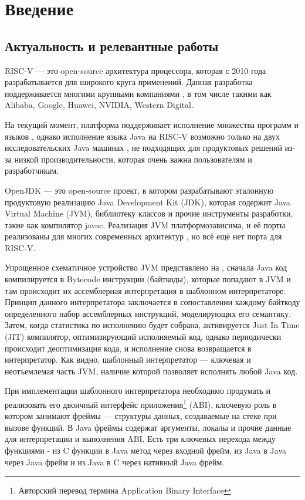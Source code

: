 \section*{Введение}
\renewcommand{\thefigure}{\arabic{figure}}
\subsection*{Актуальность и релевантные работы}

RISC-V --- это open-source архитектура процессора, которая с 2010 года разрабатывается для широкого круга применений. Данная разработка поддерживается многими крупными компаниями \cite{riscv:members}, в том числе такими как Alibaba, Google, Huawei, NVIDIA, Western Digital.

На текущий момент, платформа поддерживает исполнение множества программ и языков \cite{riscv:soft}, однако исполнение языка Java на RISC-V возможно только на двух исследовательских Java машинах \cite{jikes, maxine}, не подходящих для продуктовых решений из-за низкой производительности, которая очень важна пользователям и разработчикам.

OpenJDK --- это open-source проект, в котором разрабатывают эталонную \cite{openjdk_reference, openjdk:FAQ} продуктовую реализацию Java Development Kit (JDK), которая содержит Java Virtual Machine (JVM), библиотеку классов и прочие инструменты разработки, такие как компилятор javac. Реализация JVM платформозависима, и её порты реализованы для многих современных архитектур \cite{openjdk:platforms}, но всё ещё нет порта для RISC-V.


Упрощенное схематичное устройство JVM представлено на , сначала Java код компилируется в Bytecode инструкции (байткоды), которые попадают в JVM и там происходит их ассемблерная интерпретация в шаблонном интерпретаторе. Принцип данного интерпретатора заключается в сопоставлении каждому байткоду определенного набор ассемблерных инструкций, моделирующих его семантику. Затем, когда статистика по исполнению будет собрана, активируется Just In Time (JIT) компилятор, оптимизирующий исполняемый код, однако периодически происходит деоптимизация кода, и исполнение снова возвращается в интерпретатор. Как видно, шаблонный интерпретатор --- ключевая и неотъемлемая часть JVM, наличие которой позволяет исполнять любой Java код.

При имплементации шаблонного интерпретатора необходимо продумать и реализовать его двоичный интерфейс приложения\footnote{Авторский перевод термина Application Binary Interface} (ABI), ключевую роль в котором занимают фреймы --- структуры данных, создаваемые на стеке при вызове функций. В Java фреймы содержат аргументы, локалы и прочие данные для интерпретации и выполнения ABI. Есть три ключевых перехода между функциями - из C функции в Java метод через входной фрейм, из Java в Java через Java фрейм и из Java в C через нативный Java фрейм.



